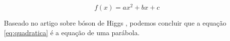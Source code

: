 \begin{equation}
    f(x)= ax^2 + bx + c
\end{equation}
    
Baseado no artigo sobre bóson de Higgs \cite{higgs2012discovery}, podemos concluir que a equação \ref{eq:quadratica} é a equação de uma parábola.   